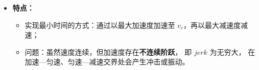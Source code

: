 \documentclass[../main.tex]{subfiles}
\begin{document}
\begin{enumerate}
\begin{enumerate}
{\begin{itemize}
\begin{itemize}
                \vspace{0.5em}
                
                \item[(3)] \textbf{可行但无法达到 $v_{\max}$（无匀速段）：}
                \[
                v_c = v_{\lim} = 
                \sqrt{h a_{\max} + \frac{v_0^2 + v_1^2}{2}} < v_{\max},
                \]
                \[
                T_a = \frac{v_{\lim}-v_0}{a_{\max}}, \quad
                T_d = \frac{v_{\lim}-v_1}{a_{\max}}, \quad
                T = T_a + T_d.
                \]
                
                {\footnotesize
                其中：
                $v_{\lim}$ 为在加速、减速段相接时的极限速度（最大可达匀速速度）；
                $T_a,T_d,T$、$v_0,v_1,a_{\max},h$ 含义同上。
                }
                \end{itemize}
                
                \vspace{0.5em}
                \item \textbf{特点：}
                \begin{itemize}
                    \item 实现最小时间的方式：通过以最大加速度加速至 $v_c$，再以最大减速度减速；
                    \item 问题：虽然速度连续，但加速度存在\textbf{不连续阶跃}，
                    即 $jerk$ 为无穷大，
                    在加速—匀速、匀速—减速交界处会产生冲击或振动。
                \end{itemize}
            \end{itemize}
            }


\end{enumerate}
\end{enumerate}
\end{document}
